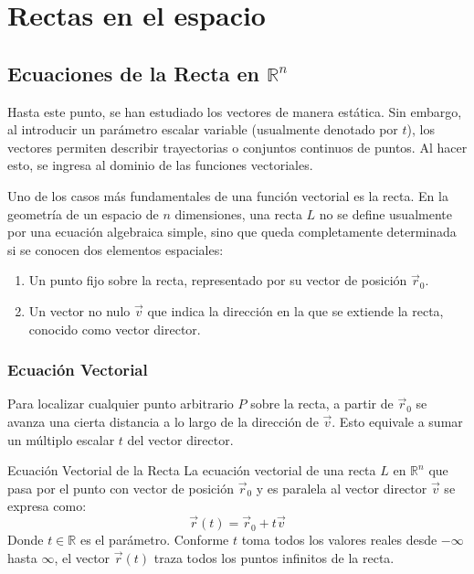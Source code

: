 \section{Rectas en el espacio}

\subsection{Ecuaciones de la Recta en $\mathbb{R}^n$}

Hasta este punto, se han estudiado los vectores de manera estática. Sin embargo, al introducir un parámetro escalar variable (usualmente denotado por $t$), los vectores permiten describir trayectorias o conjuntos continuos de puntos. Al hacer esto, se ingresa al dominio de las funciones vectoriales. 

Uno de los casos más fundamentales de una función vectorial es la recta. En la geometría de un espacio de $n$ dimensiones, una recta $L$ no se define usualmente por una ecuación algebraica simple, sino que queda completamente determinada si se conocen dos elementos espaciales:
\begin{enumerate}
    \item Un punto fijo sobre la recta, representado por su vector de posición $\vec{r}_0$.
    \item Un vector no nulo $\vec{v}$ que indica la dirección en la que se extiende la recta, conocido como vector director.
\end{enumerate}

\subsubsection{Ecuación Vectorial}

Para localizar cualquier punto arbitrario $P$ sobre la recta, a partir de $\vec{r}_0$ se avanza una cierta distancia a lo largo de la dirección de $\vec{v}$. Esto equivale a sumar un múltiplo escalar $t$ del vector director.

\begin{mydefinition}{Ecuación Vectorial de la Recta}
La ecuación vectorial de una recta $L$ en $\mathbb{R}^n$ que pasa por el punto con vector de posición $\vec{r}_0$ y es paralela al vector director $\vec{v}$ se expresa como:
$$ \vec{r}(t) = \vec{r}_0 + t\vec{v} $$
Donde $t \in \mathbb{R}$ es el parámetro. Conforme $t$ toma todos los valores reales desde $-\infty$ hasta $\infty$, el vector $\vec{r}(t)$ traza todos los puntos infinitos de la recta.
\end{mydefinition}

